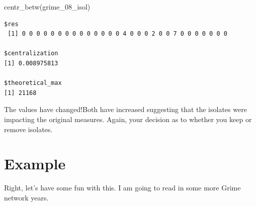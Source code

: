 \documentclass[
  letterpaper,
  DIV=11,
  numbers=noendperiod]{scrreprt}
\newenvironment{Shaded}{\begin{snugshade}}{\end{snugshade}}
\newcommand{\FunctionTok}[1]{\textcolor[rgb]{0.28,0.35,0.67}{#1}}
\newcommand{\NormalTok}[1]{\textcolor[rgb]{0.00,0.23,0.31}{#1}}
\begin{document}
\begin{Shaded}
\begin{Highlighting}[]
\FunctionTok{centr\_betw}\NormalTok{(grime\_08\_isol)}
\end{Highlighting}
\end{Shaded}

\begin{verbatim}
$res
 [1] 0 0 0 0 0 0 0 0 0 0 0 0 0 0 4 0 0 0 2 0 0 7 0 0 0 0 0 0 0

$centralization
[1] 0.008975813

$theoretical_max
[1] 21168
\end{verbatim}

The values have changed!Both have increased suggesting that the isolates
were impacting the original measures. Again, your decision as to whether
you keep or remove isolates.

\section{Example}\label{example}

Right, let's have some fun with this. I am going to read in some more
Grime network years.
\end{document}
